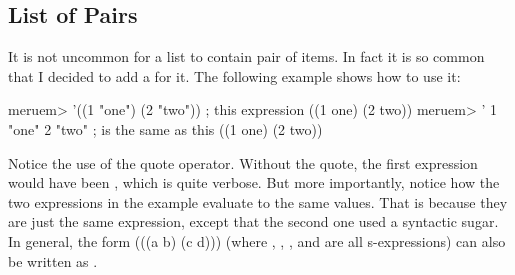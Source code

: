 \subsection{List of Pairs}
It is not uncommon for a list to contain pair of items. In fact it is so common that I decided to add a  for it. The following example shows how to use it:

\begin{REPL}
meruem> '((1 "one") (2 "two"))  ; this expression
((1 one) (2 two))
meruem> '{ 1 "one" 2 "two" }  ; is the same as this
((1 one) (2 two))
\end{REPL}

Notice the use of the quote operator. Without the quote, the first expression would have been , which is quite verbose. But more importantly, notice how the two expressions in the example evaluate to the same values. That is because they are just the same expression, except that the second one used a syntactic sugar. In general, the form \code(((a b) (c d))) (where , , , and  are all s-expressions) can also be written as .